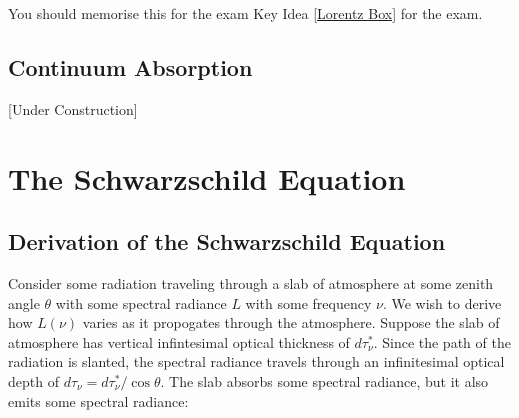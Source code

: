 You should memorise this for the exam Key Idea \ref{Lorentz Box} for the exam.

\section{Continuum Absorption}\label{Continuum}

[Under Construction]

\chapter{The Schwarzschild Equation}\label{Schwarzschild Section}

\section{Derivation of the Schwarzschild Equation}

Consider some radiation traveling through a slab of atmosphere at some zenith angle $\theta$ with some spectral radiance $L$ with some frequency $\nu$. We wish to derive how $L(\nu)$ varies as it propogates through the atmosphere. Suppose the slab of atmosphere has vertical infintesimal optical thickness of $d\tau_\nu^*$. Since the path of the radiation is slanted, the spectral radiance travels through an infinitesimal optical depth of $d\tau_\nu=d\tau_\nu^*/\cos\theta$. The slab absorbs some spectral radiance, but it also emits some spectral radiance:

\begin{figure}[H]
    \centering
\end{figure}

